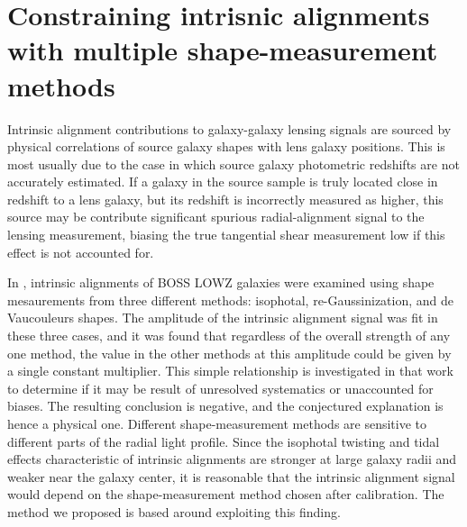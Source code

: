 \documentclass[a4paper,fleqn,usenatbib]{mnras}
\begin{document}
\section{Constraining intrisnic alignments with multiple shape-measurement methods}
\label{sec:newmethod}
Intrinsic alignment contributions to galaxy-galaxy lensing signals are sourced by physical correlations of source galaxy shapes with lens galaxy positions. This is most usually due to the case in which source galaxy photometric redshifts are not accurately estimated. If a galaxy in the source sample is truly located close in redshift to a lens galaxy, but its redshift is incorrectly measured as higher, this source may be contribute significant spurious radial-alignment signal to the lensing measurement, biasing the true tangential shear measurement low if this effect is not accounted for.


In \cite{Singh2016}, intrinsic alignments of BOSS LOWZ galaxies were examined using shape mesaurements from three different methods: isophotal, re-Gaussinization, and de Vaucouleurs shapes. The amplitude of the intrinsic alignment signal was fit in these three cases, and it was found that regardless of the overall strength of any one method, the value in the other methods at this amplitude could be given by a single constant multiplier. This simple relationship is investigated in that work to determine if it may be result of unresolved systematics or unaccounted for biases. The resulting conclusion is negative, and the conjectured explanation is hence a physical one. Different shape-measurement methods are sensitive to different parts of the radial light profile. Since the isophotal twisting and tidal effects characteristic of intrinsic alignments are stronger at large galaxy radii and weaker near the galaxy center, it is reasonable that the intrinsic alignment signal would depend on the shape-measurement method chosen after calibration. The method we proposed is based around exploiting this finding.
\end{document}
